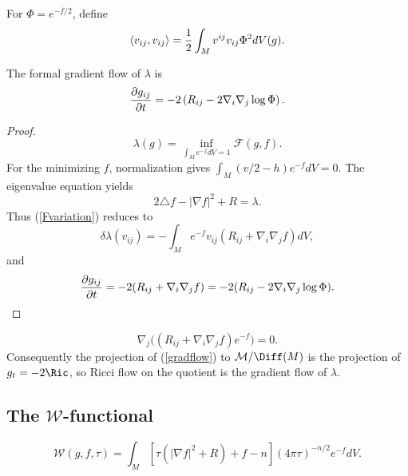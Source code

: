 For $\Phi=e^{-\bar f/2}$, define
\begin{equation}\label{riemmetric}
\langle v_{ij},v_{ij}\rangle={1\over2}\int_Mv^{ij}v_{ij}\Phi^2dV(g).
\end{equation}
\begin{lemma}
  \label{lem:kl-ricci-flow-as-gradient-flow-gradient-flow-formula-lambda-invariant}
The formal gradient flow of $\lambda$ is
\begin{equation}
{\partial g_{ij}\over\partial t}=-2\left(R_{ij}-2\nabla_i\nabla_j\log\Phi\right).
\end{equation}
\end{lemma}
\begin{proof}
\sketch
\begin{equation}\label{eqnlambdadef}
\lambda(g)=\inf_{\int_Me^{-f}dV=1}{\mathcal F}(g,f).
\end{equation}
For the minimizing $f$, normalization gives
$\int_M(v/2-h)e^{-f}dV=0$. The eigenvalue equation yields
\begin{equation}\label{feqn}2\triangle f-|\nabla f|^2+R=\lambda.
\end{equation}
Thus (\ref{Fvariation}) reduces to
\begin{equation}\label{lambdavar}
\delta\lambda(v_{ij})=-\int_Me^{-f}v_{ij}(R_{ij}+\nabla_i\nabla_jf)dV,
\end{equation}
and
\begin{equation}\label{gradflow}
{\partial g_{ij}\over\partial t}=-2(R_{ij}+\nabla_i\nabla_jf)
=-2(R_{ij}-2\nabla_i\nabla_j\log\Phi).
\end{equation}
\end{proof}
\begin{equation}
\nabla_j\big((R_{ij}+\nabla_i\nabla_jf)e^{-f}\big)=0.
\end{equation}
Consequently the projection of (\ref{gradflow}) to ${\mathcal M}/\Diff(M)$ is
the projection of $g_t=-2\Ric$, so Ricci flow on the quotient is the gradient
flow of $\lambda$.

\subsection{The ${\mathcal W}$-functional}
\label{Basic Example for Section 3.1}

\begin{definition}
  \label{def:kl-w-entropy-w-entropy-definition}
\begin{equation}
{\mathcal W}(g,f,\tau)=\int_M\left[\tau(|\nabla f|^2+R)+f-n\right](4\pi\tau)^{-n/2}e^{-f}dV.
\end{equation}
\end{definition}

